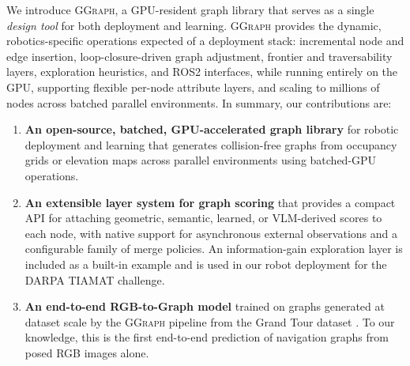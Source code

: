 \documentclass{article}
\newcommand{\jonas}[1]{{\color{red} Jonas: #1}}
\newcommand{\sysname}{\textcolor{ggcolor}{\textsc{GGraph}}\xspace}
\begin{document}
We introduce \sysname, a GPU-resident graph library that serves as a single \emph{design tool} for both deployment and learning. \sysname provides the dynamic, robotics-specific operations expected of a deployment stack: incremental node and edge insertion, loop-closure-driven graph adjustment, frontier and traversability layers, exploration heuristics, and ROS2 interfaces, while running entirely on the GPU, supporting flexible per-node attribute layers, and scaling to millions of nodes across batched parallel environments. In summary, our contributions are:
\begin{enumerate}
\item \textbf{An open-source, batched, GPU-accelerated graph library} for robotic deployment and learning that generates collision-free graphs from occupancy grids or elevation maps across parallel environments using batched-GPU operations.
\item \textbf{An extensible layer system for graph scoring} that provides a compact API for attaching geometric, semantic, learned, or VLM-derived scores to each node, with native support for asynchronous external observations and a configurable family of merge policies. An information-gain exploration layer is included as a built-in example and is used in our robot deployment for the DARPA TIAMAT challenge.
\item \textbf{An end-to-end RGB-to-Graph model} trained on graphs generated at dataset scale by the \sysname pipeline from the Grand Tour dataset \cite{grandtour}. To our knowledge, this is the first end-to-end prediction of navigation graphs from posed RGB images alone.
\end{enumerate}

\end{document}
